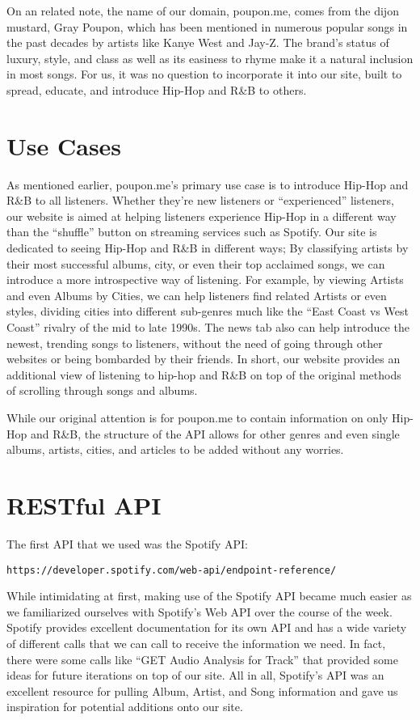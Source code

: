 \documentclass{scrartcl}
\begin{document}
On an related note, the name of our domain, poupon.me, comes from the dijon mustard, Gray Poupon, which has been mentioned in numerous popular songs in the past decades by artists like Kanye West and Jay-Z. The brand’s status of luxury, style, and class as well as its easiness to rhyme make it a natural inclusion in most songs. For us, it was no question to incorporate it into our site, built to spread, educate, and introduce Hip-Hop and R\&B to others.

\section{Use Cases}
\indent As mentioned earlier, poupon.me’s primary use case is to introduce Hip-Hop and R\&B to all listeners. Whether they’re new listeners or “experienced” listeners, our website is aimed at helping listeners experience Hip-Hop in a different way than the “shuffle” button on streaming services such as Spotify. Our site is dedicated to seeing Hip-Hop and R\&B in different ways; By classifying artists by their most successful albums, city, or even their top acclaimed songs, we can introduce a more introspective way of listening. For example, by viewing Artists and even Albums by Cities, we can help listeners find related Artists or even styles, dividing cities into different sub-genres much like the “East Coast vs West Coast” rivalry of the mid to late 1990s. The news tab also can help introduce the newest, trending songs to listeners, without the need of going through other websites or being bombarded by their friends. In short, our website provides an additional view of listening to hip-hop and R\&B on top of the original methods of scrolling through songs and albums. 

While our original attention is for poupon.me to contain information on only Hip-Hop and R\&B, the structure of the API allows for other genres and even single albums, artists, cities, and articles to be added without any worries.

\section{RESTful API}
The first API that we used was the Spotify API: \begin{verbatim}https://developer.spotify.com/web-api/endpoint-reference/\end{verbatim}

While intimidating at first, making use of the Spotify API became much easier as we familiarized ourselves with Spotify’s Web API over the course of the week. Spotify provides excellent documentation for its own API and has a wide variety of different calls that we can call to receive the information we need. In fact, there were some calls like “GET Audio Analysis for Track” that provided some ideas for future iterations on top of our site. All in all, Spotify’s API was an excellent resource for pulling Album, Artist, and Song information and gave us inspiration for potential additions onto our site.
\end{document}
